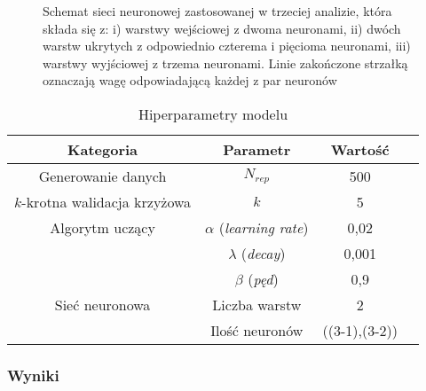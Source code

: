 \documentclass[11pt]{book}
\theoremstyle{definition}
\begin{document}
\begin{SCfigure}
{\begin{tikzpicture}
	
	
	
	
		\end{tikzpicture}}
	\caption{Schemat sieci neuronowej zastosowanej w trzeciej analizie, która składa się z: i) warstwy wejściowej z dwoma neuronami, ii) dwóch warstw ukrytych z odpowiednio czterema i pięcioma neuronami, iii) warstwy wyjściowej z trzema neuronami. Linie zakończone strzałką oznaczają wagę odpowiadającą każdej z par neuronów} \label{tab:scheme3} 	
\end{SCfigure}


\begin{table}
	\centering
	\caption{Hiperparametry modelu}\label{tab:hyper3} 
	\begin{tabular}{c|c c c}
		\hline 
		Kategoria & Parametr & Wartość &   \\\hline
		Generowanie danych & $N_{rep}$ & 500 & \\ \hline
		$k$-krotna walidacja krzyżowa & $k$ & 5 &\\ \hline
		
		Algorytm uczący& $\alpha$ (\textit{learning rate}) & 0,02 & \\
		& $\lambda$ (\textit{decay}) & 0,001 & \\ 
		& $\beta$ (\textit{pęd}) & 0,9 & \\ \hline
		Sieć neuronowa & Liczba warstw & 2 & \\ 
		& Ilość neuronów & ((3-1),(3-2)) & \\ \hline
		
	\end{tabular}
\end{table}


\subsubsection{Wyniki}
%
%
\end{document}
